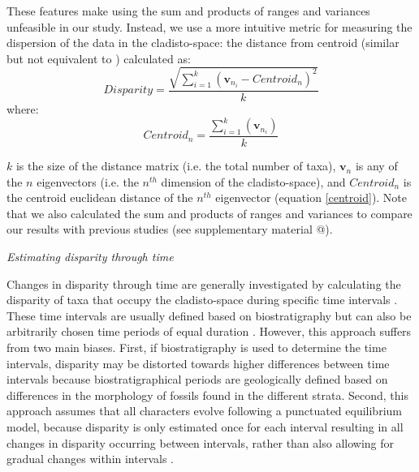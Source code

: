 \documentclass[12pt,letterpaper]{article}
\renewcommand{\subsection}[1]{%
\bigskip
\begin{center}
\begin{large}
\normalfont\itshape #1
\end{large}
\end{center}}
\begin{document}
These features make using the sum and products of ranges and variances unfeasible in our study.
Instead, we use a more intuitive %
metric for measuring the dispersion of the data in the cladisto-space: the distance from centroid (similar but not equivalent to \citealt{Wills1994,kornextinction2013,huang2015origins}) calculated as: %
\begin{equation}
    Disparity=\frac{\displaystyle\sqrt{\sum_{i=1}^{k}{(\mathbf{v}_{n_{i}}-Centroid_{n})^2}}}{k}
\end{equation}
where:
\begin{equation}
    Centroid_{n}=\frac{\displaystyle\sum_{i=1}^{k}(\mathbf{v}_{n_{i}})}{k}
    \label{centroid}
\end{equation}

\noindent
$k$ is the size of the distance matrix (i.e. the total number of taxa), $\mathbf{v}_{n}$ is any of the $n$ eigenvectors (i.e. the $n^{th}$ dimension of the cladisto-space),%
 and $Centroid_{n}$ is the centroid euclidean distance of the $n^{th}$ eigenvector (equation \ref{centroid}).
Note that we also calculated the sum and products of ranges and variances to compare our results with previous studies (see supplementary material @). %

\subsection{Estimating disparity through time} 
Changes in disparity through time are generally investigated by calculating the disparity of taxa that occupy the cladisto-space during specific time intervals \citep[e.g][]{cisneros2010,prentice2011,Hughes20082013,hopkinsdecoupling2013,bentonmodels2014,bensonfaunal2014}.
These time intervals are usually defined based on biostratigraphy \citep[e.g.][]{cisneros2010,prentice2011,Hughes20082013,bentonmodels2014} but can also be arbitrarily chosen time periods of equal duration \citep{hopkinsdecoupling2013,bensonfaunal2014}.
However, this approach suffers from two main biases. 
First, if biostratigraphy is used to determine the time intervals, disparity may be distorted towards higher differences between time intervals because biostratigraphical periods are geologically defined based on differences in the morphology of fossils found in the different strata.
Second, this approach assumes that all characters evolve following a punctuated equilibrium model, because disparity is only estimated once for each interval resulting in all changes in disparity occurring between intervals, rather than also allowing for gradual changes within intervals \citep{Hunt21042015}.
\end{document}
